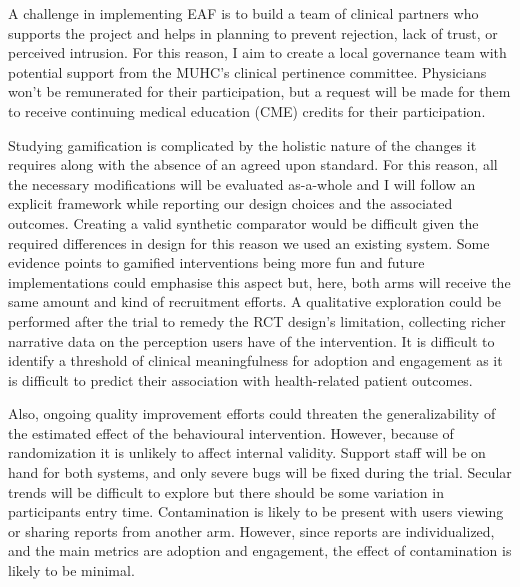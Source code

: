 A challenge in implementing \gls{EAF} is to build a team of clinical partners who supports the project and helps in planning to prevent rejection, lack of trust, or perceived intrusion. For this reason, I aim to create a local governance team with potential support from the MUHC's clinical pertinence committee. Physicians won't be remunerated for their participation, but a request will be made for them to receive continuing medical education (CME) credits for their participation.

Studying gamification is complicated by the holistic nature of the changes it requires along with the absence of an agreed upon standard. For this reason, all the necessary modifications will be evaluated as-a-whole and I will follow an explicit framework while reporting our design choices and the associated outcomes. Creating a valid synthetic comparator would be difficult given the required differences in design for this reason we used an existing system. Some evidence points to gamified interventions being more fun and future implementations could emphasise this aspect but, here, both arms will receive the same amount and kind of recruitment efforts. A qualitative exploration could be performed after the trial to remedy the RCT design's limitation, collecting richer narrative data on the perception users have of the intervention. It is difficult to identify a threshold of clinical meaningfulness for adoption and engagement as it is difficult to predict their association with health-related patient outcomes.

Also, ongoing quality improvement efforts could threaten the generalizability of the estimated effect of the behavioural intervention. However, because of randomization it is unlikely to affect internal validity. Support staff will be on hand for both systems, and only severe bugs will be fixed during the trial. Secular trends will be difficult to explore but there should be some variation in participants entry time. Contamination is likely to be present with users viewing or sharing reports from another arm. However, since reports are individualized, and the main metrics are adoption and engagement, the effect of contamination is likely to be minimal.



